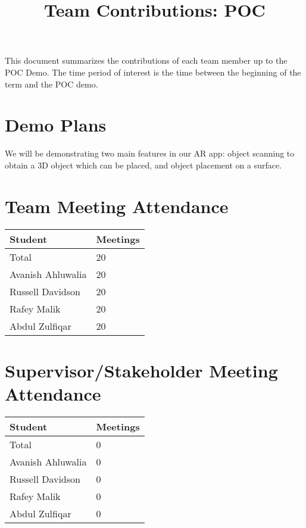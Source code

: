 \documentclass{article}
\title{Team Contributions: POC\\\progname}
\author{\authname}
\date{}
\begin{document}
\maketitle

This document summarizes the contributions of each team member up to the POC
Demo.  The time period of interest is the time between the beginning of the term
and the POC demo.

\section{Demo Plans}

We will be demonstrating two main features in our AR app: object scanning to obtain a 3D object which can be placed, and object placement on a surface.

\section{Team Meeting Attendance}

\begin{table}[H]
\centering
\begin{tabular}{ll}
\toprule
\textbf{Student} & \textbf{Meetings}\\
\midrule
Total & 20\\
Avanish Ahluwalia & 20\\
Russell Davidson & 20\\
Rafey Malik & 20\\
Abdul Zulfiqar & 20\\
\bottomrule
\end{tabular}
\end{table}

\section{Supervisor/Stakeholder Meeting Attendance}

\begin{table}[H]
\centering
\begin{tabular}{ll}
\toprule
\textbf{Student} & \textbf{Meetings}\\
\midrule
Total & 0\\
Avanish Ahluwalia & 0\\
Russell Davidson & 0\\
Rafey Malik & 0\\
Abdul Zulfiqar & 0\\
\bottomrule
\end{tabular}
\end{table}
\end{document}
